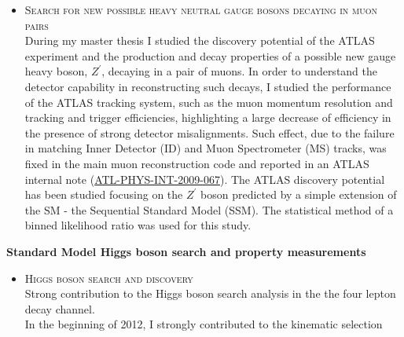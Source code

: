 \begin{cvinterests}
{\begin{itemize}[labelwidth=0.05in,align=right,leftmargin=!,labelsep=0pt,
itemsep=0.0em]
PRL journal (\href{https://arxiv.org/abs/1807.06573}{arXiv:1807.06573 [hep-ex]}).\\
For this search I developed the official analysis framework, which provides the
main object and event selection and the SM background processes estimation:
it is being used since Summer 2015. I optimised the event
selection in order to get the highest background rejection and signal
significance. I also studied the background processes arising from jets
mis-reconstructed as leptons ($W$+jets and multi-jet processes), which have a
key role in final states with taus, being up to 50\% of the total expected SM
background. Moreover I evaluated the relevant systematic uncertainties
(theoretical and experimental ones) on the background estimates.
%
\item[] \textsc{Search for new possible heavy neutral gauge bosons decaying in
muon pairs}\\
During my master thesis I studied the discovery potential of the ATLAS
experiment and the production and decay properties of a possible new gauge
heavy boson, $Z^{\prime}$, decaying in a pair of muons. In order to understand
the detector capability in reconstructing such decays, I studied the
performance of the ATLAS tracking system, such as the muon momentum resolution
and tracking and trigger efficiencies, highlighting a large decrease of
efficiency in the presence of strong detector misalignments. Such effect, due to
the failure in matching Inner Detector (ID) and Muon Spectrometer (MS) tracks,
was fixed in the main muon reconstruction code and reported in an ATLAS internal
note (\href{https://cds.cern.ch/record/1191139}{ATL-PHYS-INT-2009-067}).
The ATLAS discovery potential has been studied focusing on the $Z^{\prime}$ boson
predicted by a simple extension of the SM - the Sequential Standard Model (SSM).
The statistical method of a binned likelihood ratio was used for this study.
\end{itemize}
%
\textbf{Standard Model Higgs boson search and property measurements}\\
\vspace{-1.8em}
\begin{itemize}[labelwidth=0.05in,align=right,leftmargin=!,labelsep=0pt,
itemsep=0.0em]
\item[] \textsc{Higgs boson search and discovery}\\
Strong contribution to the Higgs boson search analysis in the the four lepton
decay channel.\\
In the beginning of 2012, I strongly contributed to the kinematic selection

\end{itemize}}
\end{cvinterests}
